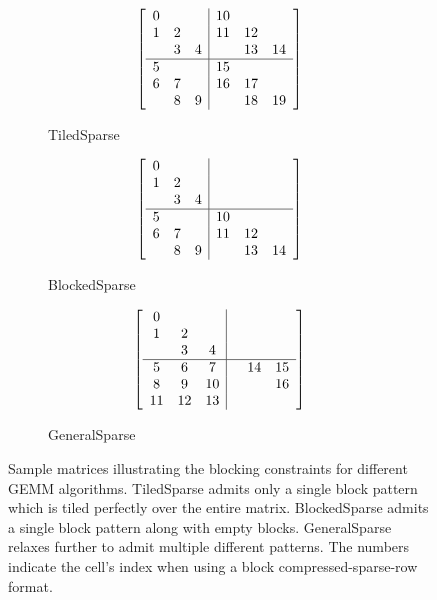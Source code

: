 \begin{figure}[tb]
  \centering
  \begin{subfigure}[b]{0.32\textwidth}
    \centering
          \[
      \left[
          \begin{array}{c c c | c c c }
          0 &   &   & 10 &   &   \\
          1 & 2 &   & 11& 12&   \\
            & 3 & 4 &   & 13& 14  \\
          \hline
          5 &   &   & 15  &   &   \\
          6 & 7 &   & 16  &17   &   \\
            & 8 & 9 &   & 18  &19   \\
          \end{array}
          \right]
      \]
    \caption{TiledSparse}
    \label{fig:tiledblocks}
  \end{subfigure}
  \begin{subfigure}[b]{0.32\textwidth}
    \centering
      \[
      \left[
          \begin{array}{c c c | c c c }
          0 &   &   &    &    &    \\
          1 & 2 &   &    &    &    \\
            & 3 & 4 &    &    &    \\
          \hline
          5 &   &   & 10 &    &    \\
          6 & 7 &   & 11 & 12 &    \\
            & 8 & 9 &    & 13 & 14 \\
          \end{array}
          \right]
      \]    \caption{BlockedSparse}
    \label{fig:blockedblocks}
  \end{subfigure}
    \begin{subfigure}[b]{0.32\textwidth}
    \centering
      \[
      \left[
          \begin{array}{c c c | c c c }
          0 &   &   &    &    &    \\
          1 & 2 &   &    &    &    \\
            & 3 & 4 &    &    &    \\
          \hline
          5  & 6  & 7  &    &  14& 15  \\
          8  & 9  & 10 &    &    & 16 \\
          11 & 12 & 13 &    &    &    \\
          \end{array}
          \right]
      \]    \caption{GeneralSparse}
    \label{fig:generalblocks}
  \end{subfigure}
  \caption{Sample matrices illustrating the blocking constraints for different GEMM algorithms. TiledSparse admits only a single block pattern which is tiled perfectly over the entire matrix. BlockedSparse admits a single block pattern along with empty blocks. GeneralSparse relaxes further to admit multiple different patterns. The numbers indicate the cell's index when using a block compressed-sparse-row format. }
  \label{fig:matrixblocks}

\end{figure}




